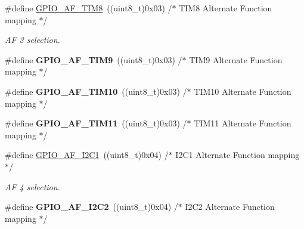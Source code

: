 \begin{DoxyCompactItemize}
\#define \hyperlink{group___g_p_i_o___alternat__function__selection__define_gaf7562d5cf5d33dbc7b7c69df63182583}{G\+P\+I\+O\+\_\+\+A\+F\+\_\+\+T\+I\+M8}~((uint8\+\_\+t)0x03)  /$\ast$ T\+I\+M8 Alternate Function mapping $\ast$/
\begin{DoxyCompactList}\small\item\em AF 3 selection. \end{DoxyCompactList}\item 
\mbox{\label{group___g_p_i_o___alternat__function__selection__define_ga6c7cfbf2f21945814c6526a7bacb1384}} 
\#define {\bfseries G\+P\+I\+O\+\_\+\+A\+F\+\_\+\+T\+I\+M9}~((uint8\+\_\+t)0x03)  /$\ast$ T\+I\+M9 Alternate Function mapping $\ast$/
\item 
\mbox{\label{group___g_p_i_o___alternat__function__selection__define_ga3881c36c71f0cbd7efacb424b39cd9f4}} 
\#define {\bfseries G\+P\+I\+O\+\_\+\+A\+F\+\_\+\+T\+I\+M10}~((uint8\+\_\+t)0x03)  /$\ast$ T\+I\+M10 Alternate Function mapping $\ast$/
\item 
\mbox{\label{group___g_p_i_o___alternat__function__selection__define_gaeb30ba1cb15de0d4af78933e9dcfd033}} 
\#define {\bfseries G\+P\+I\+O\+\_\+\+A\+F\+\_\+\+T\+I\+M11}~((uint8\+\_\+t)0x03)  /$\ast$ T\+I\+M11 Alternate Function mapping $\ast$/
\item 
\mbox{\label{group___g_p_i_o___alternat__function__selection__define_gaa246f87c460c4bb4036b8ab39e0220f1}} 
\#define \hyperlink{group___g_p_i_o___alternat__function__selection__define_gaa246f87c460c4bb4036b8ab39e0220f1}{G\+P\+I\+O\+\_\+\+A\+F\+\_\+\+I2\+C1}~((uint8\+\_\+t)0x04)  /$\ast$ I2\+C1 Alternate Function mapping $\ast$/
\begin{DoxyCompactList}\small\item\em AF 4 selection. \end{DoxyCompactList}\item 
\mbox{\label{group___g_p_i_o___alternat__function__selection__define_ga4a82500bac7239134e2c28d4656810f1}} 
\#define {\bfseries G\+P\+I\+O\+\_\+\+A\+F\+\_\+\+I2\+C2}~((uint8\+\_\+t)0x04)  /$\ast$ I2\+C2 Alternate Function mapping $\ast$/

\end{DoxyCompactItemize}
